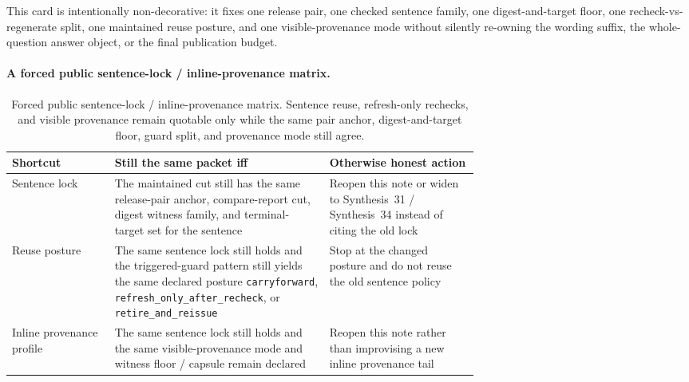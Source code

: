 \documentclass[11pt]{article}
\begin{document}
This card is intentionally non-decorative: it fixes one release pair, one checked sentence family, one digest-and-target floor, one recheck-vs-regenerate split, one maintained reuse posture, and one visible-provenance mode without silently re-owning the wording suffix, the whole-question answer object, or the final publication budget.\cite{series:workedexample}

\paragraph{A forced public sentence-lock / inline-provenance matrix.}
\begin{table}[t]
\centering
\small
\begin{tabularx}{\linewidth}{@{}p{0.22\linewidth}p{0.46\linewidth}X@{}}
\toprule
\textbf{Shortcut} & \textbf{Still the same packet iff} & \textbf{Otherwise honest action}\\
\midrule
Sentence lock & The maintained cut still has the same release-pair anchor, compare-report cut, digest witness family, and terminal-target set for the sentence & Reopen this note or widen to Synthesis~31 / Synthesis~34 instead of citing the old lock \\
Reuse posture & The same sentence lock still holds and the triggered-guard pattern still yields the same declared posture \texttt{carryforward}, \texttt{refresh\_only\_after\_recheck}, or \texttt{retire\_and\_reissue} & Stop at the changed posture and do not reuse the old sentence policy \\
Inline provenance profile & The same sentence lock still holds and the same visible-provenance mode and witness floor / capsule remain declared & Reopen this note rather than improvising a new inline provenance tail \\
\bottomrule
\end{tabularx}
\caption{Forced public sentence-lock / inline-provenance matrix. Sentence reuse, refresh-only rechecks, and visible provenance remain quotable only while the same pair anchor, digest-and-target floor, guard split, and provenance mode still agree.}
\label{tab:forced-sentence-lock-matrix}
\end{table}
\end{document}
